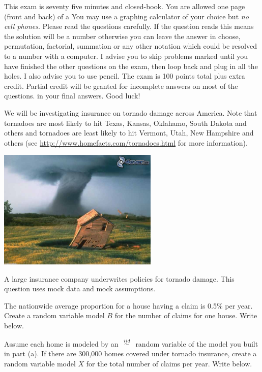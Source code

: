 \documentclass[12pt]{article}
\begin{document}
This exam is seventy five minutes and closed-book. You are allowed one page (front and back) of a  You may use a graphing calculator of your choice but \emph{no cell phones}. Please read the questions carefully. If the question reads  this means the solution will be a number otherwise you can leave the answer in choose, permutation, factorial, summation or any other notation which could be resolved to a number with a computer. I advise you to skip problems marked  until you have finished the other questions on the exam, then loop back and plug in all the holes. I also advise you to use pencil. The exam is 100 points total plus extra credit. Partial credit will be granted for incomplete answers on most of the questions.  in your final answers. Good luck!

\pagebreak

\problem We will be investigating insurance on tornado damage across America. Note that tornadoes are most likely to hit Texas, Kansas, Oklahamo, South Dakota and others and tornadoes are least likely to hit Vermont, Utah, New Hampshire and others (see \url{http://www.homefacts.com/tornadoes.html} for more information). 

\begin{center}
\includegraphics[width=3in]{tornado.jpg}
\end{center}

A large insurance company underwrites policies for tornado damage. This question uses mock data and mock assumptions. \\

\benum

 The nationwide average proportion for a house having a claim is 0.5\% per year. Create a random variable model $B$ for the number of claims for one house. Write  below.  

 Assume each home is modeled by an $\iid$ random variable of the model you built in part (a). If there are 300,000 homes covered under tornado insurance, create a random variable model $X$ for the total number of claims per year. Write  below. 
\end{document}
